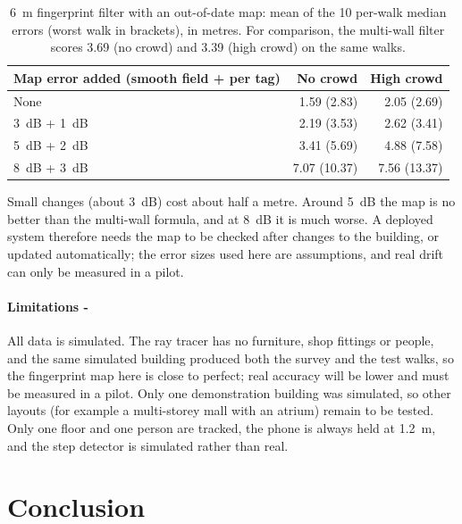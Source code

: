 \documentclass[11pt,a4paper]{article}
\begin{document}
\begin{table}[h]
  \centering
  \caption{\SI{6}{m} fingerprint filter with an out-of-date map: mean of the 10 per-walk
  median errors (worst walk in brackets), in metres. For comparison, the multi-wall
  filter scores 3.69 (no crowd) and 3.39 (high crowd) on the same walks.}
  \label{tab:stale}
  \small
  \begin{tabular}{@{}lrr@{}}
    \toprule
    Map error added (smooth field + per tag) & No crowd & High crowd\\
    \midrule
    None                                 & 1.59 (2.83) & 2.05 (2.69)\\
    \SI{3}{dB} + \SI{1}{dB}             & 2.19 (3.53) & 2.62 (3.41)\\
    \SI{5}{dB} + \SI{2}{dB}             & 3.41 (5.69) & 4.88 (7.58)\\
    \SI{8}{dB} + \SI{3}{dB}             & 7.07 (10.37) & 7.56 (13.37)\\
    \bottomrule
  \end{tabular}
\end{table}

Small changes (about \SI{3}{dB}) cost about half a metre. Around \SI{5}{dB} the map is no
better than the multi-wall formula, and at \SI{8}{dB} it is much worse. A deployed system
therefore needs the map to be checked after changes to the building, or updated
automatically; the error sizes used here are assumptions, and real drift can only be
measured in a pilot.

\paragraph{Limitations -} All data is simulated. The ray tracer has no furniture, shop
fittings or people, and the same simulated building produced both the survey and the
test walks, so the fingerprint map here is close to perfect; real accuracy will be lower
and must be measured in a pilot. Only one demonstration building was simulated, so other layouts (for example a
multi-storey mall with an atrium) remain to be tested. Only one floor and one person are
tracked, the phone is
always held at \SI{1.2}{m}, and the step detector is simulated rather than real.

\section{Conclusion}
\label{sec:conclusion}
\end{document}

